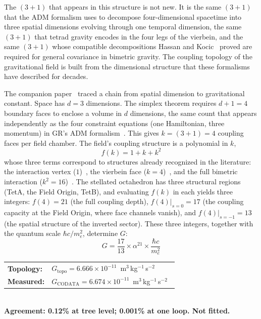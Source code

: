\documentclass[aps,prd,preprint,superscriptaddress,showpacs,preprintnumbers,amsmath,amssymb,nofootinbib]{revtex4-2}
\begin{document}
The $(3{+}1)$ that appears in this structure is not new. It is the same $(3{+}1)$ that the ADM formalism uses to decompose four-dimensional spacetime into three spatial dimensions evolving through one temporal dimension, the same $(3{+}1)$ that tetrad gravity encodes in the four legs of the vierbein, and the same $(3{+}1)$ whose compatible decompositions Hassan and Kocic~\cite{hassankocic2018} proved are required for general covariance in bimetric gravity. The coupling topology of the gravitational field is built from the dimensional structure that these formalisms have described for decades.

The companion paper~\cite{paper6} traced a chain from spatial dimension to gravitational constant. Space has $d = 3$ dimensions. The simplex theorem requires $d + 1 = 4$ boundary faces to enclose a volume in $d$ dimensions, the same count that appears independently as the four constraint equations (one Hamiltonian, three momentum) in GR's ADM formalism~\cite{adm1962}. This gives $k = (3{+}1) = 4$ coupling faces per field chamber. The field's coupling structure is a polynomial in $k$,
\begin{equation}
f(k) = 1 + k + k^2
\end{equation}
whose three terms correspond to structures already recognized in the literature: the interaction vertex ($1$)~\cite{hinterbichler2012}, the vierbein face ($k = 4$)~\cite{mtw1973}, and the full bimetric interaction ($k^2 = 16$)~\cite{hassan2012}. The stellated octahedron has three structural regions (TetA, the Field Origin, TetB), and evaluating $f(k)$ in each yields three integers: $f(4) = 21$ (the full coupling depth), $f(4)|_{s=0} = 17$ (the coupling capacity at the Field Origin, where face channels vanish), and $f(4)|_{s=-1} = 13$ (the spatial structure of the inverted sector). These three integers, together with the quantum scale $\hbar c / m_e^2$, determine $G$:
\begin{equation}
G = \frac{17}{13} \times \alpha^{21} \times \frac{\hbar c}{m_e^2}
\label{eq:G}
\end{equation}
\begin{center}
\renewcommand{\arraystretch}{1.3}
\begin{tabular}{@{}ll@{}}
\textbf{Topology:} & $G_{\text{topo}} = 6.666 \times 10^{-11}$~m$^3$\,kg$^{-1}$\,s$^{-2}$ \\
\textbf{Measured:} & $G_{\text{CODATA}} = 6.674 \times 10^{-11}$~m$^3$\,kg$^{-1}$\,s$^{-2}$~\cite{codata2022} \\
\end{tabular}\\[4pt]
\textbf{Agreement: 0.12\% at tree level; 0.001\% at one loop. Not fitted.}
\end{center}
\end{document}
